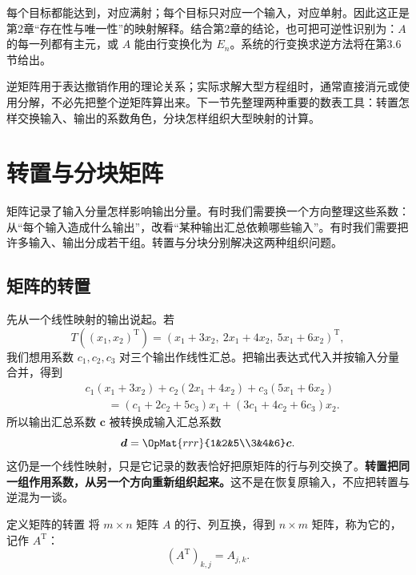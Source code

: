 \documentclass[a4paper,12pt,twoside,openany,fontset=none]{ctexbook}
\newcounter{definition}[chapter]
\newenvironment{definition}[1][]{\begin{defBox}{定义}{#1}}{\end{defBox}}
\numberwithin{equation}{chapter}
\begin{document}
每个目标都能达到，对应满射；每个目标只对应一个输入，对应单射。因此这正是第2章“存在性与唯一性”的映射解释。结合第2章的结论，也可把可逆性识别为：$A$ 的每一列都有主元，或 $A$ 能由行变换化为 $E_n$。系统的行变换求逆方法将在第3.6节给出。


逆矩阵用于表达撤销作用的理论关系；实际求解大型方程组时，通常直接消元或使用分解，不必先把整个逆矩阵算出来。下一节先整理两种重要的数表工具：转置怎样交换输入、输出的系数角色，分块怎样组织大型映射的计算。


\section{转置与分块矩阵}
\label{sec:three-transpose-block}

矩阵记录了输入分量怎样影响输出分量。有时我们需要换一个方向整理这些系数：从“每个输入造成什么输出”，改看“某种输出汇总依赖哪些输入”。有时我们需要把许多输入、输出分成若干组。转置与分块分别解决这两种组织问题。

\subsection{矩阵的转置}

先从一个线性映射的输出说起。若
\[
 T((x_1,x_2)^{\mathrm T})=
 (x_1+3x_2,\ 2x_1+4x_2,\ 5x_1+6x_2)^{\mathrm T},
\]
我们想用系数 $c_1,c_2,c_3$ 对三个输出作线性汇总。把输出表达式代入并按输入分量合并，得到
\[
\begin{aligned}
 &c_1(x_1+3x_2)+c_2(2x_1+4x_2)+c_3(5x_1+6x_2)\\
 &\qquad=(c_1+2c_2+5c_3)x_1+(3c_1+4c_2+6c_3)x_2.
\end{aligned}
\]
所以输出汇总系数 $\boldsymbol c$ 被转换成输入汇总系数
\[
 \boldsymbol d=\OpMat{rrr}{1&2&5\\3&4&6}\boldsymbol c.
\]
这仍是一个线性映射，只是它记录的数表恰好把原矩阵的行与列交换了。\textbf{转置把同一组作用系数，从另一个方向重新组织起来。}这不是在恢复原输入，不应把转置与逆混为一谈。

\begin{definition}[矩阵的转置]
将 $m\times n$ 矩阵 $A$ 的行、列互换，得到 $n\times m$ 矩阵，称为它的，记作 $A^{\mathrm T}$：
\[
 (A^{\mathrm T})_{k,j}=A_{j,k}.
\]
\end{definition}
\end{document}
